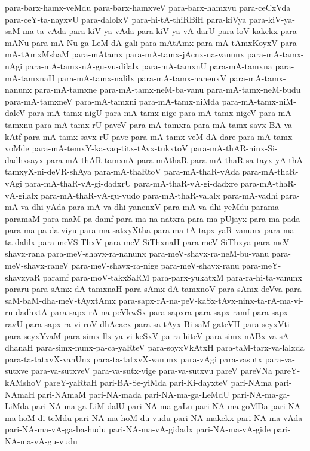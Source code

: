 {para-barx-hamx-veMdu
para-barx-hamxveV
para-barx-hamxvu
para-ceCxVda
para-ceY-ta-nayxvU
para-dalolxV
para-hi-tA-thiRBiH
para-kiVya
para-kiV-ya-saM-ma-ta-vAda
para-kiV-ya-vAda
para-kiV-ya-vA-darU
para-loV-kakekx
para-mANu
para-mA-Nu-ga-LeM-dA-gali
para-mAtAmx
para-mA-tAmxKoyxV
para-mA-tAmxMshaM
para-mAtamx
para-mA-tamx-jAcnx-na-vanunx
para-mA-tamx-nAgi
para-mA-tamx-nA-gu-vu-dilalx
para-mA-tamxnU
para-mA-tamxna
para-mA-tamxnaH
para-mA-tamx-nalilx
para-mA-tamx-nanenxV
para-mA-tamx-nanunx
para-mA-tamxne
para-mA-tamx-neM-ba-vanu
para-mA-tamx-neM-budu
para-mA-tamxneV
para-mA-tamxni
para-mA-tamx-niMda
para-mA-tamx-niM-daleV
para-mA-tamx-nigU
para-mA-tamx-nige
para-mA-tamx-nigeV
para-mA-tamxnu
para-mA-tamx-rU-paveV
para-mA-tamxra
para-mA-tamx-savx-BA-va-kAtf
para-mA-tamx-savx-rU-pave
para-mA-tamx-veM-dA-dare
para-mA-tamx-voMde
para-mA-temxY-ka-vaq-titx-tAvx-tukxtoV
para-mA-thAR-ninx-Si-dadhxsayx
para-mA-thAR-tamxnA
para-mAthaR
para-mA-thaR-sa-tayx-yA-thA-tamxyX-ni-deVR-shAya
para-mA-thaRtoV
para-mA-thaR-vAda
para-mA-thaR-vAgi
para-mA-thaR-vA-gi-dadxrU
para-mA-thaR-vA-gi-dadxre
para-mA-thaR-vA-gilalx
para-mA-thaR-vA-gu-vudo
para-mA-thaR-valalx
para-mA-vadhi
para-mA-va-dhi-yAda
para-mA-va-dhi-yanenxV
para-mA-va-dhi-yeMdu
parama
paramaM
para-maM-pa-damf
para-ma-na-natxra
para-ma-pUjayx
para-ma-pada
para-ma-pa-da-viyu
para-ma-satxyXtha
para-ma-tA-tapx-yaR-vanunx
para-ma-ta-dalilx
para-meVSiThxV
para-meV-SiThxnaH
para-meV-SiThxya
para-meV-shavx-rana
para-meV-shavx-ra-nanunx
para-meV-shavx-ra-neM-bu-vanu
para-meV-shavx-raneV
para-meV-shavx-ra-nige
para-meV-shavx-ranu
para-meY-shavxyaR
paramf
para-moV-takxSaRM
para-parx-yukatxM
para-ra-hi-ta-vanunx
pararu
para-sAmx-dA-tamxnaH
para-sAmx-dA-tamxnoV
para-sAmx-deVva
para-saM-baM-dha-meV-tAyxtAmx
para-sapx-rA-na-peV-kaSx-tAvx-ninx-ta-rA-ma-vi-ru-dadhxtA
para-sapx-rA-na-peVkwSx
para-sapxra
para-sapx-ramf
para-sapx-ravU
para-sapx-ra-vi-roV-dhAcacx
para-sa-tAyx-Bi-saM-gateVH
para-seyxVti
para-seyxYvaM
para-simx-llx-ya-vi-keSxV-pa-ra-hiteV
para-simx-nABx-va-sA-dhanaH
para-simx-nunx-pa-ca-yaRteV
para-soyxVkAtxH
para-taM-tarx-va-lalxda
para-ta-tatxvX-vanUnx
para-ta-tatxvX-vanunx
para-vAgi
para-vasutx
para-va-sutxve
para-va-sutxveV
para-va-sutx-vige
para-va-sutxvu
pareV
pareVNa
pareY-kAMshoV
pareY-yaRtaH
pari-BA-Se-yiMda
pari-Ki-dayxteV
pari-NAma
pari-NAmaH
pari-NAmaM
pari-NA-mada
pari-NA-ma-ga-LeMdU
pari-NA-ma-ga-LiMda
pari-NA-ma-ga-LiM-dalU
pari-NA-ma-gaLu
pari-NA-ma-goMDa
pari-NA-ma-hoM-di-teMdu
pari-NA-ma-hoM-du-vudu
pari-NA-makekx
pari-NA-ma-vAda
pari-NA-ma-vA-ga-ba-hudu
pari-NA-ma-vA-gidadx
pari-NA-ma-vA-gide
pari-NA-ma-vA-gu-vudu
}
